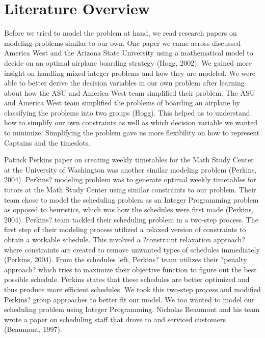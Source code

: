 \documentclass[12pt]{article}
\begin{document}
\section*{Literature Overview}
Before we tried to model the problem at hand, we read research papers on modeling problems similar to our own. One paper we came across discussed America West and the Arizona State University using a mathematical model to decide on an optimal airplane boarding strategy (Hogg, 2002). We gained more insight on handling mixed integer problems and how they are modeled. We were able to better derive the decision variables in our own problem after learning about how the ASU and America West team simplified their problem. The ASU and America West team simplified the problems of boarding an airplane by classifying the problems into two groups (Hogg). This helped us to understand how to simplify our own constraints as well as which decision variable we wanted to minimize. Simplifying the problem gave us more flexibility on how to represent Captains and the timeslots.

Patrick Perkins paper on creating weekly timetables for the Math Study Center at the University of Washington was another similar modeling problem (Perkins, 2004). Perkins? modeling problem was to generate optimal weekly timetables for tutors at the Math Study Center using similar constraints to our problem. Their team chose to model the scheduling problem as an Integer Programming problem as opposed to heuristics, which was how the schedules were first made (Perkins, 2004). Perkins? team tackled their scheduling problem in a two-step process. The first step of their modeling process utilized a relaxed version of constraints to obtain a workable schedule. This involved a ?constraint relaxation approach? where constraints are created to remove unwanted types of schedules immediately (Perkins, 2004). From the schedules left, Perkins? team utilizes their ?penalty approach? which tries to maximize their objective function to figure out the best possible schedule. Perkins states that these schedules are better optimized and thus produce more efficient schedules. We took this two-step process and modified Perkins? group approaches to better fit our model. We too wanted to model our scheduling problem using Integer Programming. Nicholas Beaumont and his team wrote a paper on scheduling staff that drove to and serviced customers (Beaumont, 1997). 
\end{document}
